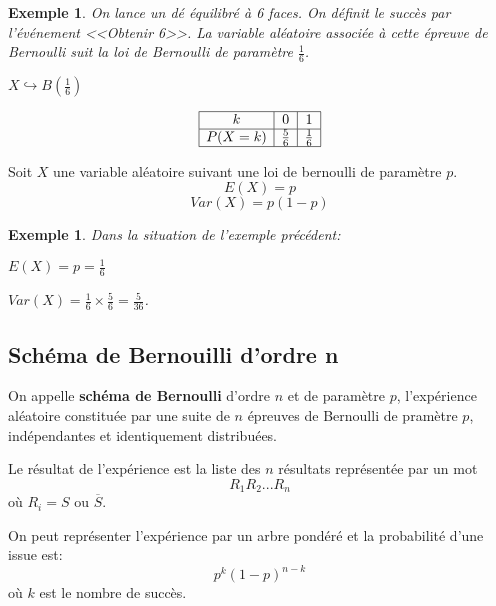 \documentclass[a4paper,11pt]{article}
\theoremstyle{break}
\newcounter{enonce}
\newtheorem{exemple}[enonce]{Exemple}
\renewcommand\arraystretch{1.3}
\renewcommand\arraystretch{1.8}
\begin{document}
  
 
   \begin{exemple}
    On lance un dé équilibré à 6 faces. On définit le succès par l'événement <<Obtenir 6>>.
    La variable aléatoire associée à cette épreuve de Bernoulli suit la loi de Bernoulli
    de paramètre $\frac{1}{6}$.
    
    $X \hookrightarrow B(\frac{1}{6})$
    
    \renewcommand{\arraystretch}{2.2}
     $$
\begin{array}{|c|c|c|}

\hline
    k&0&1\\
    \hline
    P(X=k)&\frac{5}{6}&\frac{1}{6}\\
    \hline
    \end{array} 
$$
  
 \end{exemple}

  \begin{proposition}
  Soit $X$ une variable aléatoire suivant une loi de bernoulli de paramètre $p$.
  $$E(X)=p$$ $$Var(X)=p(1-p)$$
  
 \end{proposition}

  \begin{exemple}
 Dans la situation de l'exemple précédent:
 
 $E(X)=p=\frac{1}{6}$
 
 $Var(X)=\frac{1}{6} \times \frac{5}{6}=\frac{5}{36}$.
  
 \end{exemple}
 
 \newpage
 \subsection{Schéma de Bernouilli d'ordre n}

  
  \begin{definition}
  On appelle \textbf{schéma de Bernoulli} d'ordre $n$ et de paramètre $p$, 
  l'expérience aléatoire constituée
  par une suite de $n$ épreuves de Bernoulli de pramètre $p$, indépendantes et identiquement distribuées.
  
  Le résultat de l'expérience est la liste des $n$ résultats représentée par un mot
  $$R_1R_2...R_n$$
  où $R_i= S$ ou $\overline{S}$.
  
  On peut représenter l'expérience par un arbre pondéré et la probabilité d'une issue est:
  $$p^k(1-p)^{n-k}$$ où $k$ est le nombre de succès.
 \end{definition}
\end{document}
